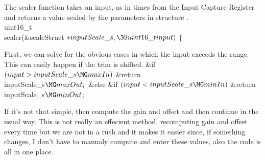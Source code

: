 The scaler function takes an input, as in times from the Input Capture
Register and returns a value scaled by the parameters in structure
.
\Y\B\\{uint16\_t}\\{scaler}(\&{scaleStruct} ${}{*}\\{inputScale\_s},\39%
\\{uint16\_t}\\{input}){}$\1\1 $\{{}$\Y\par
\fi

First, we can solve for the obvious cases in which the input exceeds the range.
This can easily happen if the trim is shifted.
\Y\B\&{if} ${}(\\{input}>\\{inputScale\_s}\MG\\{maxIn}){}$\1\5
\&{return} \\{inputScale\_s}${}\MG\\{maxOut};{}$\2\6
\&{else} \&{if} ${}(\\{input}<\\{inputScale\_s}\MG\\{minIn}){}$\1\5
\&{return} \\{inputScale\_s}${}\MG\\{minOut}{}$;\2\par
\fi

If it's not that simple, then compute the gain and offset and then continue in
the usual way.
This is not really an effecient method, recomputing gain and offset every time
but we are not in a rush and it makes it easier since, if something changes,
I don't have to manualy compute and enter these values, also the code is all in
one place.

